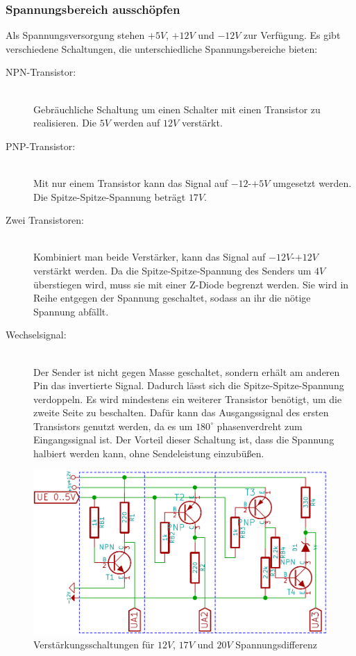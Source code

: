 \subsubsection{Spannungsbereich ausschöpfen}
Als Spannungsversorgung stehen $+5V$, $+12V$ und $-12V$ zur Verfügung. Es gibt verschiedene Schaltungen, die unterschiedliche Spannungsbereiche bieten:
\begin{description}
	\item[NPN-Transistor:]\hspace{1pt}\\
		Gebräuchliche Schaltung um einen Schalter mit einen Transistor zu realisieren. Die $5V$ werden auf $12V$ verstärkt.
	\item[PNP-Transistor:]\hspace{1pt}\\
		Mit nur einem Transistor kann das Signal auf $-12$-$+5V$ umgesetzt werden. Die Spitze-Spitze-Spannung beträgt $17V$.
	\item[Zwei Transistoren:]\hspace{1pt}\\
		Kombiniert man beide Verstärker, kann das Signal auf $-12V$-$+12V$ verstärkt werden. Da die Spitze-Spitze-Spannung des Senders um $4V$ überstiegen wird, muss sie mit einer Z-Diode begrenzt werden. Sie wird in Reihe entgegen der Spannung geschaltet, sodass an ihr die nötige Spannung abfällt.
	\item[Wechselsignal:]\hspace{1pt}\\
		Der Sender ist nicht gegen Masse geschaltet, sondern erhält am anderen Pin das invertierte Signal. Dadurch lässt sich die Spitze-Spitze-Spannung verdoppeln. Es wird mindestens ein weiterer Transistor benötigt, um die zweite Seite zu beschalten. Dafür kann das Ausgangssignal des ersten Transistors genutzt werden, da es um $180^\circ$ phasenverdreht zum Eingangssignal ist. Der Vorteil dieser Schaltung ist, dass die Spannung halbiert werden kann, ohne Sendeleistung einzubüßen.
\end{description}

\begin{figure}[H]
\centering
\includegraphics[scale=0.6]{images/transistorschaltungen.png}
\caption{Verstärkungsschaltungen für $12V$, $17V$ und $20V$ Spannungsdifferenz} \label{img:I3}
\end{figure}

